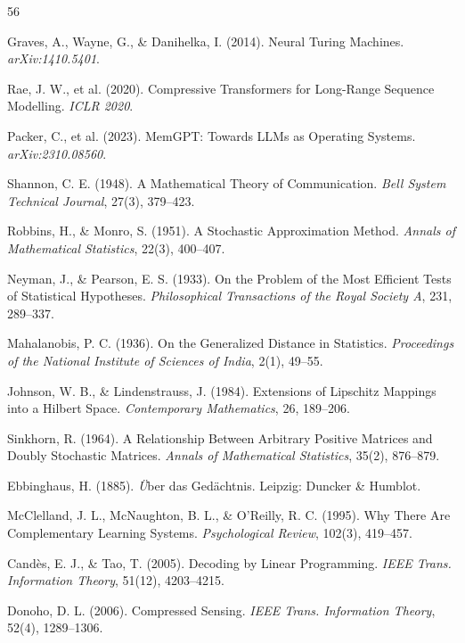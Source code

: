 \documentclass[12pt,a4paper]{article}
\theoremstyle{definition}
\theoremstyle{remark}
\begin{document}
\newpage

\begin{thebibliography}{56}

 Graves, A., Wayne, G., \& Danihelka, I. (2014). Neural Turing Machines. \textit{arXiv:1410.5401}.

 Rae, J. W., et al. (2020). Compressive Transformers for Long-Range Sequence Modelling. \textit{ICLR 2020}.

 Packer, C., et al. (2023). MemGPT: Towards LLMs as Operating Systems. \textit{arXiv:2310.08560}.

 Shannon, C. E. (1948). A Mathematical Theory of Communication. \textit{Bell System Technical Journal}, 27(3), 379--423.

 Robbins, H., \& Monro, S. (1951). A Stochastic Approximation Method. \textit{Annals of Mathematical Statistics}, 22(3), 400--407.

 Neyman, J., \& Pearson, E. S. (1933). On the Problem of the Most Efficient Tests of Statistical Hypotheses. \textit{Philosophical Transactions of the Royal Society A}, 231, 289--337.

 Mahalanobis, P. C. (1936). On the Generalized Distance in Statistics. \textit{Proceedings of the National Institute of Sciences of India}, 2(1), 49--55.

 Johnson, W. B., \& Lindenstrauss, J. (1984). Extensions of Lipschitz Mappings into a Hilbert Space. \textit{Contemporary Mathematics}, 26, 189--206.

 Sinkhorn, R. (1964). A Relationship Between Arbitrary Positive Matrices and Doubly Stochastic Matrices. \textit{Annals of Mathematical Statistics}, 35(2), 876--879.

 Ebbinghaus, H. (1885). \textit{\"U}ber das Ged\"achtnis. Leipzig: Duncker \& Humblot.

 McClelland, J. L., McNaughton, B. L., \& O'Reilly, R. C. (1995). Why There Are Complementary Learning Systems. \textit{Psychological Review}, 102(3), 419--457.

 Cand\`{e}s, E. J., \& Tao, T. (2005). Decoding by Linear Programming. \textit{IEEE Trans. Information Theory}, 51(12), 4203--4215.

 Donoho, D. L. (2006). Compressed Sensing. \textit{IEEE Trans. Information Theory}, 52(4), 1289--1306.


\end{thebibliography}
\end{document}
